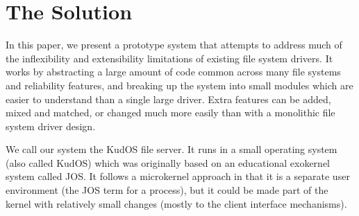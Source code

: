 \section{The Solution}
\label{sec:solution}

In this paper, we present a prototype system that attempts to address much of
the inflexibility and extensibility limitations of existing file system drivers.
It works by abstracting a large amount of code common across many file systems
and reliability features, and breaking up the system into small modules which
are easier to understand than a single large driver. Extra features can be
added, mixed and matched, or changed much more easily than with a monolithic
file system driver design.

We call our system the KudOS file server. It runs in a small operating system
(also called KudOS) which was originally based on an educational exokernel
system called JOS. It follows a microkernel approach in that it is a separate
user environment (the JOS term for a process), but it could be made part of the
kernel with relatively small changes (mostly to the client interface
mechanisms).



